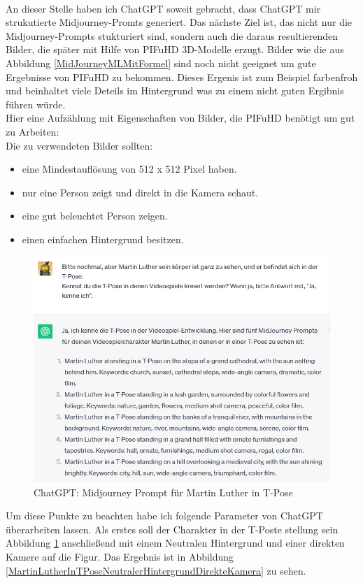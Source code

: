 \\
An dieser Stelle haben ich ChatGPT soweit gebracht, dass ChatGPT mir strukutierte Midjourney-Promts generiert. Das nächste Ziel ist, das nicht nur die Midjourney-Prompts stukturiert sind, sondern auch die daraus resultierenden Bilder, die später mit Hilfe von PIFuHD 3D-Modelle erzugt. Bilder wie die aus Abbildung  \ref{MidJourneyMLMitFormel} sind noch nicht geeignet um gute Ergebnisse von PIFuHD zu bekommen. Dieses Ergenis ist zum Beispiel farbenfroh und beinhaltet viele Deteils im Hintergrund was zu einem nicht guten Ergibnis führen würde.
\\
Hier eine Aufzählung mit Eigenschaften von Bilder, die PIFuHD benötigt um gut zu Arbeiten:
\\
Die zu verwendeten Bilder sollten:
\begin{itemize}
	\item eine Mindestauflösung von 512 x 512 Pixel haben.
	\item nur eine Person zeigt und direkt in die Kamera schaut.
	\item eine gut beleuchtet Person zeigen.
	\item einen einfachen Hintergrund besitzen.
\end{itemize}
\begin{figure}
	\centering
	\includegraphics[scale=0.7]{BilderFuerBA/09.png}
	\caption{ChatGPT: Midjourney Prompt für Martin Luther in T-Pose}
	\label{chatgptMartinLutherMJinTPose}
\end{figure}
Um diese Punkte zu beachten habe ich folgende Parameter von ChatGPT überarbeiten lassen. Als erstes soll der Charakter in der T-Poste stellung sein Abbildung \ref{chatgptMartinLutherMJinTPose} anschließend mit einem Neutralen Hintergrund und einer direkten Kamere auf die Figur. Das Ergebnis ist in Abbildung \ref{MartinLutherInTPoseNeutralerHintergrundDirekteKamera} zu sehen.
